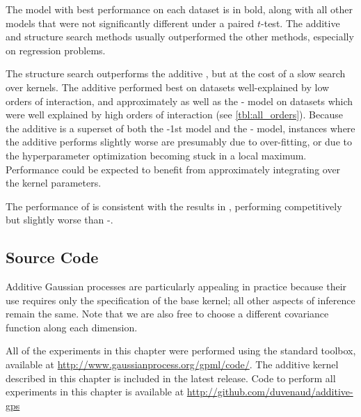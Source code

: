 The model with best performance on each dataset is in bold, along with all other models that were not significantly different under a paired $t$-test.
The additive and structure search methods usually outperformed the other methods, especially on regression problems.


The structure search outperforms the additive \gp{}, but at the cost of a slow search over kernels.
The additive \gp{} performed best on datasets well-explained by low orders of interaction, and approximately as well as the \SE{}-\gp{} model on datasets which were well explained by high orders of interaction (see \cref{tbl:all_orders}).
Because the additive \gp{} is a superset of both the \gp{}-1st model and the \kSE{}-\gp{} model, instances where the additive \gp{} performs slightly worse are presumably due to over-fitting, or due to the hyperparameter optimization becoming stuck in a local maximum. %
Performance could be expected to benefit from approximately integrating over the kernel parameters.

The performance of \HKL{} is consistent with the results in \citet{DBLP:journals/corr/abs-0909-0844}, performing competitively but slightly worse than \SE{}-\gp{}.%


\subsection{Source Code}
Additive Gaussian processes are particularly appealing in practice because their use requires only the specification of the base kernel; all other aspects of \gp{} inference remain the same.
Note that we are also free to choose a different covariance function along each dimension.

All of the experiments in this chapter were performed using the standard \GPML{} toolbox, available at \url{http://www.gaussianprocess.org/gpml/code/}.
The additive kernel described in this chapter is included in the latest release.
Code to perform all experiments in this chapter is available at \url{http://github.com/duvenaud/additive-gps}





